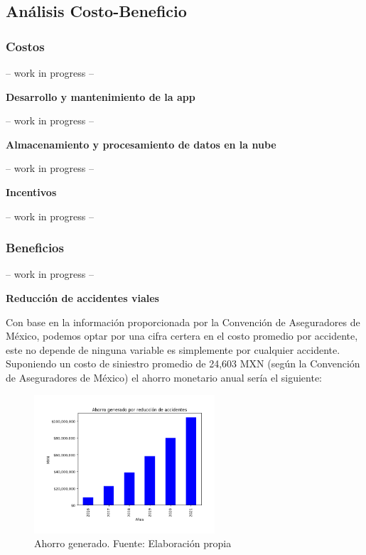 \documentclass{article}
\begin{document}
\subsection{Análisis Costo-Beneficio}
% 
% 


\subsubsection{Costos}

-- work in progress --

\textbf{Desarrollo y mantenimiento de la app}

-- work in progress --

\textbf{Almacenamiento y procesamiento de datos en la nube}

-- work in progress --

\textbf{Incentivos}

-- work in progress --


\subsubsection{Beneficios}

-- work in progress --

\textbf{Reducción de accidentes viales}


Con base en la información proporcionada por la Convención de Aseguradores de México, podemos optar por una cifra certera en el costo promedio por accidente, este no depende de ninguna variable es simplemente por cualquier accidente. 
Suponiendo un costo de siniestro promedio de 24,603 MXN (según la Convención de Aseguradores de México) el ahorro
monetario anual sería el siguiente:

	\begin{figure}[H]\centering
	\includegraphics[width=0.6\textwidth]{resources/img/accident_savings.png}
	\caption{\label{fig:accident_savings} Ahorro generado. Fuente: Elaboración propia}
    \end{figure}
\end{document}
